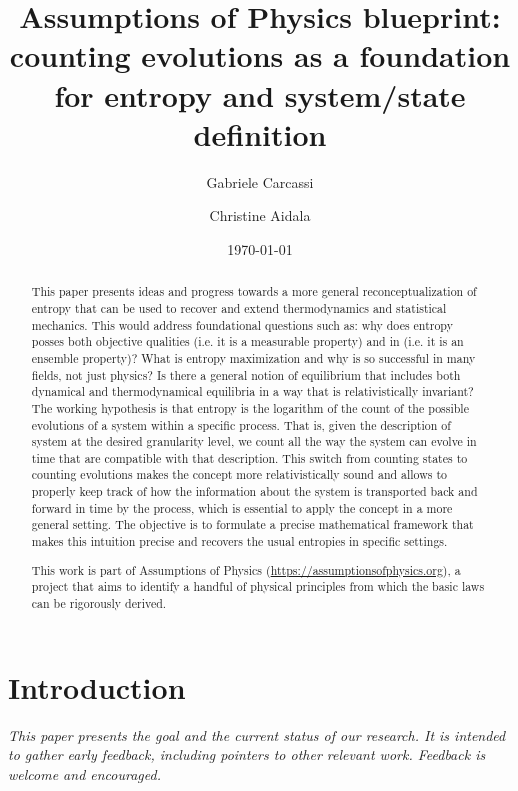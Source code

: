 \documentclass[10pt, onecolumn, longbibliography, nofootinbib]{revtex4-2}
\begin{document}
\title{Assumptions of Physics blueprint: counting evolutions as a foundation for entropy and system/state definition}
\author{Gabriele Carcassi}
\author{Christine Aidala}
\date{\today}

\begin{abstract}
    This paper presents ideas and progress towards a more general reconceptualization of entropy that can be used to recover and extend thermodynamics and statistical mechanics. This would address foundational questions such as: why does entropy posses both objective qualities (i.e. it is a measurable property) and in (i.e. it is an ensemble property)? What is entropy maximization and why is so successful in many fields, not just physics? Is there a general notion of equilibrium that includes both dynamical and thermodynamical equilibria in a way that is relativistically invariant? The working hypothesis is that entropy is the logarithm of the count of the possible evolutions of a system within a specific process. That is, given the description of system at the desired granularity level, we count all the way the system can evolve in time that are compatible with that description. This switch from counting states to counting evolutions makes the concept more relativistically sound and allows to properly keep track of how the information about the system is transported back and forward in time by the process, which is essential to apply the concept in a more general setting. The objective is to formulate a precise mathematical framework that makes this intuition precise and recovers the usual entropies in specific settings.
    
	This work is part of Assumptions of Physics (\url{https://assumptionsofphysics.org}), a project that aims to identify a handful of physical principles from which the basic laws can be rigorously derived.
\end{abstract}

\maketitle

\section{Introduction}

\emph{This paper presents the goal and the current status of our research. It is intended to gather early feedback, including pointers to other relevant work. Feedback is welcome and encouraged.}
\end{document}
